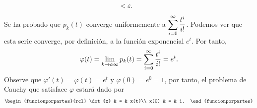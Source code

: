 \documentclass[../main.tex]{subfiles}
\begin{document}
\begin{demostracion}
\begin{align*}
                &< \varepsilon.
            \end{align*}
        Se ha probado que $p_k(t)$ converge uniformemente a $\displaystyle \sum_{i=0}^{\infty} \frac{t^i}{i!}$. Podemos ver que esta serie converge, por definición, a la función exponencial $e^t$. Por tanto,
            \begin{align*}
                \varphi(t) = \lim_{k \rightarrow a \infty} p_k(t) =  \sum_{i=0}^{\infty} \frac{t^i}{i!} = e^t.
            \end{align*}
        Observe que $\varphi '(t) = \varphi(t) = e^t$ y $\varphi (0) = e^0 = 1$, por tanto, el problema de Cauchy que satisface $\varphi$ estará dado por
            \begin{align*}
                \begin{funcionporpartes}{rcl}
                    \dot{x} & = & x(t)\\
                    x(0) & = & 1.
                \end{funcionporpartes}
            \end{align*}
            
    \end{demostracion}
\end{document}
